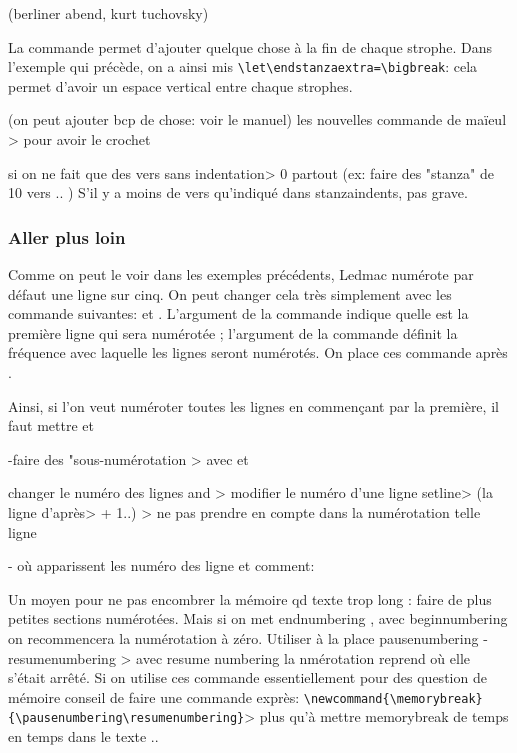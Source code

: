 (berliner abend, kurt tuchovsky)

La commande
\cs{\endstanzaextra} permet d'ajouter quelque chose à la fin de chaque strophe.
Dans l'exemple qui précède, on a ainsi mis 
\verb|\let\endstanzaextra=\bigbreak|: cela permet d'avoir 
 un espace vertical entre chaque  strophes.
 
(on peut ajouter bcp de chose: voir le manuel)
les nouvelles commande de maïeul > pour avoir le crochet

si on ne fait que des vers sans indentation> 0 partout (ex: faire des "stanza" de 10 vers .. ) S'il y a moins de vers qu'indiqué dans stanzaindents, pas grave.

\subsubsection{Aller plus loin}

Comme on peut le voir dans les exemples précédents, Ledmac numérote par défaut  une ligne sur cinq. On peut changer cela très simplement avec les commande suivantes:
 et .
L'argument  de la commande  indique quelle est  la première ligne qui sera numérotée ; l'argument  de la commande  définit la fréquence avec laquelle les lignes seront numérotés. On place ces commande après . 

Ainsi, si l'on veut numéroter toutes les lignes en commençant par la première, il faut mettre  et  




-faire des "sous-numérotation
> avec  
et 

changer le numéro des lignes
 and  > modifier le numéro d'une ligne 
setline> (la ligne d'après> + 1..)
 > ne pas prendre en compte dans la numérotation telle ligne

- où apparissent les numéro des ligne et comment: %


Un moyen pour ne pas encombrer la mémoire qd texte trop long : faire de plus petites sections numérotées. Mais si on met endnumbering ,  avec beginnumbering on recommencera la numérotation à zéro.  Utiliser à la place pausenumbering - resumenumbering > avec resume numbering la nmérotation reprend où elle s'était arrêté. Si on utilise ces commande essentiellement pour des question de mémoire conseil de faire une commande exprès: \verb|\newcommand{\memorybreak}{\pausenumbering\resumenumbering}|> plus qu'à mettre memorybreak de temps en temps dans le texte ..

